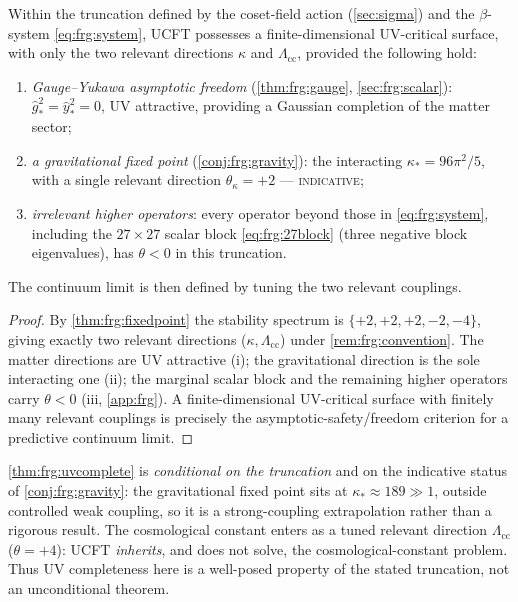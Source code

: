 \begin{theorem}
\label{thm:frg:uvcomplete}
Within the truncation defined by the coset-field action
(\autoref{sec:sigma}) and the $\beta$-system \eqref{eq:frg:system}, UCFT
possesses a finite-dimensional UV-critical surface, with only the two
relevant directions $\kappa$ and $\Lambda_{\mathrm{cc}}$, provided the
following hold:
\begin{enumerate}
  \item[\textnormal{(i)}] \emph{Gauge--Yukawa asymptotic freedom}
        (\autoref{thm:frg:gauge}, \autoref{sec:frg:scalar}):
        $\hat g^{2}_{\ast}=\hat y^{2}_{\ast}=0$, UV attractive, providing
        a Gaussian completion of the matter sector;
  \item[\textnormal{(ii)}] \emph{a gravitational fixed point}
        (\autoref{conj:frg:gravity}): the interacting
        $\kappa_{\ast}=96\pi^{2}/5$, with a single relevant direction
        $\theta_{\kappa}=+2$ --- \textsc{indicative};
  \item[\textnormal{(iii)}] \emph{irrelevant higher operators}: every
        operator beyond those in \eqref{eq:frg:system}, including the
        $27\times27$ scalar block \eqref{eq:frg:27block} (three negative
        block eigenvalues), has $\theta<0$ in this truncation.
\end{enumerate}
The continuum limit is then defined by tuning the two relevant couplings.
\end{theorem}

\begin{proof}
By \autoref{thm:frg:fixedpoint} the stability spectrum is
$\{+2,+2,+2,-2,-4\}$, giving exactly two relevant directions
($\kappa,\Lambda_{\mathrm{cc}}$) under \autoref{rem:frg:convention}. The
matter directions are UV attractive (i); the gravitational direction is
the sole interacting one (ii); the marginal scalar block and the remaining
higher operators carry $\theta<0$ (iii, \autoref{app:frg}). A
finite-dimensional UV-critical surface with finitely many relevant
couplings is precisely the asymptotic-safety/freedom criterion for a
predictive continuum limit.
\end{proof}

\begin{remark}
\label{rem:frg:caveat}
\autoref{thm:frg:uvcomplete} is \emph{conditional on the truncation} and on
the indicative status of \autoref{conj:frg:gravity}: the gravitational
fixed point sits at $\kappa_{\ast}\approx189\gg1$, outside controlled weak
coupling, so it is a strong-coupling extrapolation rather than a rigorous
result. The cosmological constant enters as a tuned relevant direction
$\Lambda_{\mathrm{cc}}$ ($\theta=+4$): UCFT \emph{inherits}, and does not
solve, the cosmological-constant problem. Thus UV completeness here is a
well-posed property of the stated truncation, not an unconditional theorem.
\end{remark}
